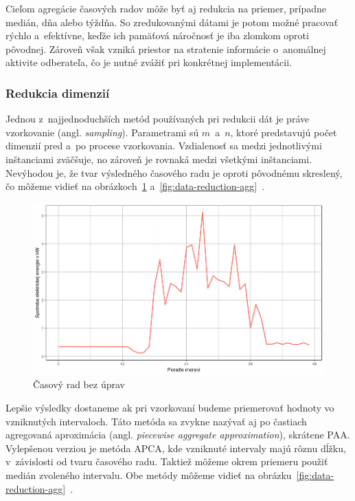 \documentclass[a4paper,twoside,slovak,12pt,appendix]{article}
\begin{document}
Cieľom agregácie časových radov môže byť aj redukcia na priemer, prípadne
medián, dňa alebo týždňa. So zredukovanými dátami je potom možné pracovať rýchlo
a~efektívne, keďže ich pamäťová náročnosť je iba zlomkom oproti pôvodnej.
Zároveň však vzniká priestor na stratenie informácie o~anomálnej aktivite
odberateľa, čo je nutné zvážiť pri konkrétnej implementácii.

\subsubsection{Redukcia dimenzií}
\label{c:dimension-reduction}
Jednou z~najjednoduchších metód používaných pri redukcii dát je práve
vzorkovanie (angl. \textit{sampling}). Parametrami sú $m$~a~$n$, ktoré
predstavujú počet dimenzií pred a~po procese vzorkovania. Vzdialenosť sa medzi
jednotlivými inštanciami zväčšuje, no zároveň je rovnaká medzi všetkými
inštanciami. Nevýhodou je, že tvar výsledného časového radu je oproti pôvodnému
skreslený, čo môžeme vidieť na obrázkoch~\ref{fig:data-reduction-orig}
a~\ref{fig:data-reduction-agg}~\cite{Fu2011}.

\begin{figure}[htbp]
  \centering
  \includegraphics[width=\textwidth]{data_reduction_orig.png}
  \caption{Časový rad bez úprav}
  \label{fig:data-reduction-orig}
\end{figure}

Lepšie výsledky dostaneme ak pri vzorkovaní budeme priemerovať hodnoty vo
vzniknutých intervaloch. Táto metóda sa zvykne nazývať aj po častiach agregovaná
aproximácia (angl. \textit{piecewise aggregate approximation}), skrátene PAA.
Vylepšenou verziou je metóda APCA, kde vzniknuté intervaly majú rôznu dĺžku,
v~závislosti od tvaru časového radu. Taktiež môžeme okrem priemeru použiť medián
zvoleného intervalu. Obe metódy môžeme vidieť na
obrázku~\ref{fig:data-reduction-agg}~\cite{Keogh2002}.
\end{document}
